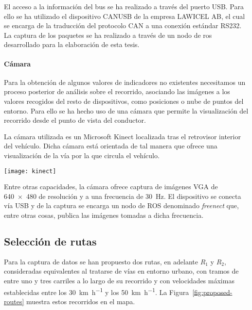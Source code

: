 El acceso a la información del bus se ha realizado a través del puerto USB. Para ello se ha utilizado el dispositivo CANUSB de la empresa LAWICEL AB, el cual se encarga de la traducción del protocolo CAN a una conexión estándar RS232. La captura de los paquetes se ha realizado a través de un nodo de \ac{ros} desarrollado para la elaboración de esta tesis.

\paragraph{Cámara}

Para la obtención de algunos valores de indicadores no existentes necesitamos un proceso posterior de análisis sobre el recorrido, asociando las imágenes a los valores recogidos del resto de dispositivos, como posiciones o nube de puntos del entorno. Para ello se ha hecho uso de una cámara que permite la visualización del recorrido desde el punto de vista del conductor.

La cámara utilizada es un Microsoft Kinect localizada tras el retrovisor interior del vehículo. Dicha cámara está orientada de tal manera que ofrece una visualización de la vía por la que circula el vehículo.

\begin{marginfigure}
	\centering
	\texttt{[image: kinect]}
	\caption[Cámara Microsoft Kinect]{La cámara Kinect desarrollada por Microsoft ofrece imágenes a color a una velocidad de \SI{30}{\fps} con una resolución de \SI{640x480}{\px}.}
	\label{fig:kinect}
\end{marginfigure}

Entre otras capacidades, la cámara ofrece captura de imágenes VGA de \SI{640x480}{\px} de resolución y a una frecuencia de \SI{30}{\Hz}. El dispositivo se conecta vía USB y de la captura se encarga un nodo de ROS denominado \textit{freenect} 	que, entre otras cosas, publica las imágenes tomadas a dicha frecuencia.

\subsection{Selección de rutas}

Para la captura de datos se han propuesto dos rutas, en adelante $R_1$ y $R_2$, consideradas equivalentes al tratarse de vías en entorno urbano, con tramos de entre uno y tres carriles a lo largo de su recorrido y con velocidades máximas establecidas entre los \SI{30}{\km\per\hour} y los \SI{50}{\km\per\hour}. La Figura~\ref{fig:proposed-routes} muestra estos recorridos en el mapa.

